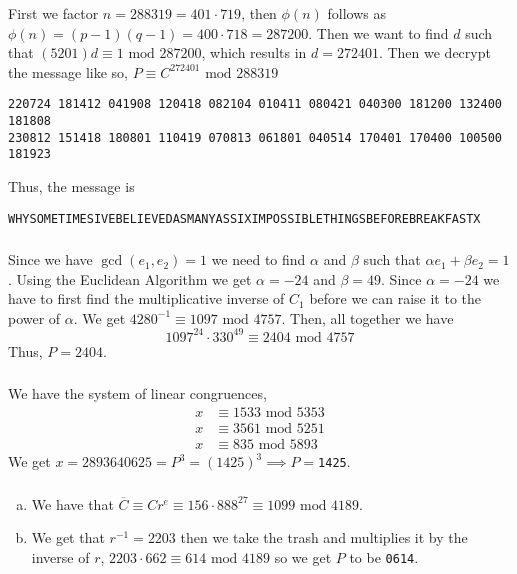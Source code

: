 \documentclass[class=article, crop=false]{standalone}
\begin{document}
\subsubsection{}
First we factor $n=288319 = 401\cdot 719$, then $\phi(n)$ follows as
  $\phi(n)=(p-1)(q-1)=400\cdot718=287200$. Then we want to find $d$
  such that $(5201)d \equiv 1\mbox{ mod }287200$, which results in $d=272401$.
  Then we decrypt the message like so, $P\equiv C^{272401}\mbox{ mod }288319$
  \begin{center}
    \verb|220724 181412 041908 120418 082104 010411 080421 040300 181200 132400 181808| \\
    \verb|230812 151418 180801 110419 070813 061801 040514 170401 170400 100500 181923|
  \end{center}
  Thus, the message is 
  \begin{center}
    \verb|WHYSOMETIMESIVEBELIEVEDASMANYASSIXIMPOSSIBLETHINGSBEFOREBREAKFASTX|
  \end{center}
\subsubsection{}
Since we have $\gcd(e_1, e_2)=1$
  we need to find $\alpha$ and $\beta$ such that $\alpha e_1 + \beta e_2 = 1$.
  Using the Euclidean Algorithm we get $\alpha = -24$ and $\beta = 49$.
  Since $\alpha=-24$ we have to first find the multiplicative inverse of $C_1$ before we can
  raise it to the power of $\alpha$. We get $4280^{-1}\equiv 1097\mbox{ mod }4757$.
  Then, all together we have
  $$1097^{24}\cdot 330^{49}\equiv 2404\mbox{ mod }4757$$
  Thus, $P=2404$.
\subsubsection{}
We have the system of linear congruences,
  \begin{align*}
    x &\equiv 1533 \mbox{ mod } 5353 \\
    x &\equiv 3561 \mbox{ mod } 5251 \\
    x &\equiv  835 \mbox{ mod } 5893
  \end{align*}
  We get $x= 2893640625= P^3 = (1425)^3 \implies P=$\verb|1425|.
\subsubsection{}
\begin{enumerate}[(a)]
  \item
    We have that 
    $\overline C \equiv Cr^e \equiv 156\cdot888^{27}\equiv 1099\mbox{ mod } 4189$.

  \item
    We get that $r^{-1}=2203$ then we take the trash and multiplies it by the inverse of $r$,
    $2203\cdot 662\equiv 614\mbox{ mod }4189$ so we get $P$ to be \verb|0614|.

\end{enumerate}
\end{document}
